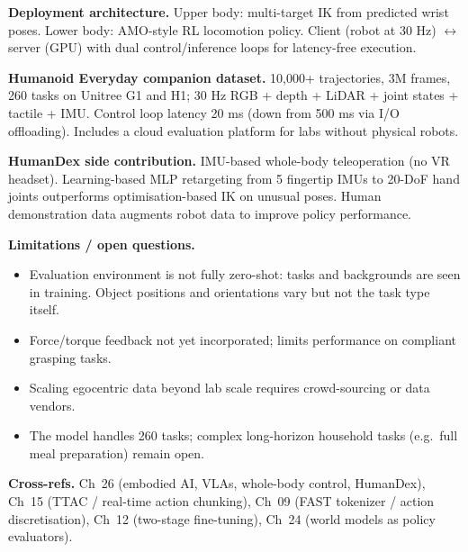\begin{paperbox}[title={Size Zero: Open Foundation Model Towards Universal Humanoid
  Loco-Manipulation (Wang et al.\ 2025, USC)}]
\medskip
\textbf{Deployment architecture.} Upper body: multi-target IK from predicted wrist poses. Lower body: AMO-style RL locomotion policy. Client (robot at 30 Hz) $\leftrightarrow$ server (GPU) with dual control/inference loops for latency-free execution.

\medskip
\textbf{Humanoid Everyday companion dataset.}
10{,}000+ trajectories, 3M frames, 260 tasks on Unitree G1 and H1; 30 Hz RGB + depth + LiDAR + joint states + tactile + IMU. Control loop latency 20 ms (down from 500 ms via I/O offloading). Includes a cloud evaluation platform for labs without physical robots.

\medskip
\textbf{HumanDex side contribution.} IMU-based whole-body teleoperation (no VR headset). Learning-based MLP retargeting from 5 fingertip IMUs to 20-DoF hand joints outperforms optimisation-based IK on unusual poses. Human demonstration data augments robot data to improve policy performance.

\medskip
\textbf{Limitations / open questions.}
\begin{itemize}
  \item Evaluation environment is not fully zero-shot: tasks and backgrounds are seen in training. Object positions and orientations vary but not the task type itself.
  \item Force/torque feedback not yet incorporated; limits performance on compliant grasping tasks.
  \item Scaling egocentric data beyond lab scale requires crowd-sourcing or data vendors.
  \item The model handles 260 tasks; complex long-horizon household tasks (e.g.\ full meal preparation) remain open.
\end{itemize}

\medskip
\textbf{Cross-refs.} Ch~26 (embodied AI, VLAs, whole-body control, HumanDex), Ch~15 (TTAC / real-time action chunking), Ch~09 (FAST tokenizer / action discretisation), Ch~12 (two-stage fine-tuning), Ch~24 (world models as policy evaluators).

\end{paperbox}
